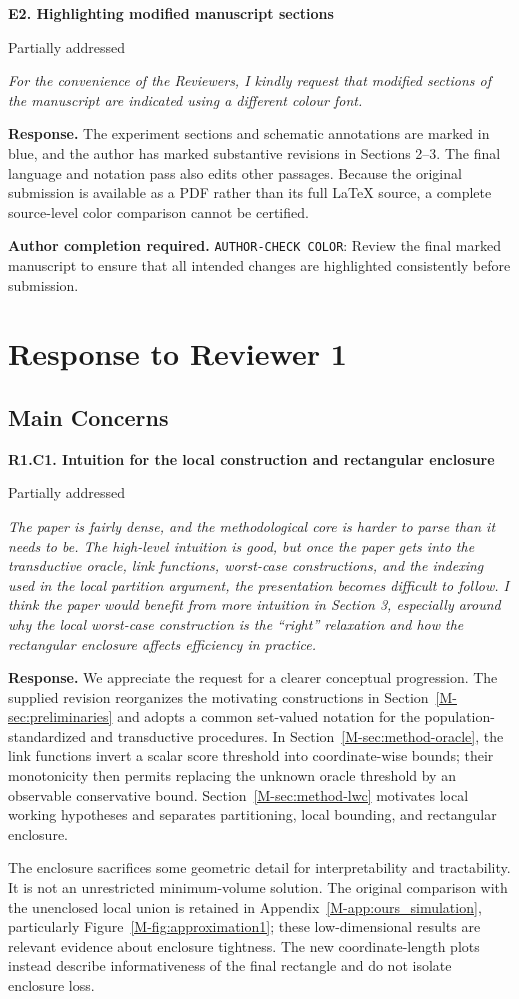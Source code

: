 \documentclass[11pt]{article}
\newcommand{\mssec}[1]{Section~\ref*{M-#1}}
\newcommand{\msapp}[1]{Appendix~\ref*{M-#1}}
\newcommand{\msfig}[1]{Figure~\ref*{M-#1}}
\newcommand{\action}[1]{\par{\small\color{ActionRed}\textbf{Author completion required.} #1\par}}
\newcommand{\point}[3]{\par\Needspace{7\baselineskip}\medskip
\noindent\parbox[t]{0.77\linewidth}{\textbf{#1}}\hfill
\parbox[t]{0.21\linewidth}{\raggedleft\small\sffamily #2}\par\nopagebreak
{\color{ReviewerBlue}\small\itshape #3\par}\textbf{Response.} }
\begin{document}
\point{E2. Highlighting modified manuscript sections}{Partially addressed}{For the convenience of the Reviewers, I kindly request that modified
sections of the manuscript are indicated using a different colour font.}
\label{response:E2}
The experiment sections and schematic annotations are marked in blue, and the author has marked substantive revisions in Sections 2--3. The final language and notation pass also edits other passages. Because the original submission is available as a PDF rather than its full LaTeX source, a complete source-level color comparison cannot be certified. \action{\texttt{AUTHOR-CHECK COLOR}: Review the final marked manuscript to ensure that all intended changes are highlighted consistently before submission.}

\clearpage
\section*{Response to Reviewer 1}
\subsection*{Main Concerns}

\point{R1.C1. Intuition for the local construction and rectangular enclosure}{Partially addressed}{The paper is fairly dense, and the methodological core is harder to parse
than it needs to be. The high-level intuition is good, but once the paper
gets into the transductive oracle, link functions, worst-case
constructions, and the indexing used in the local partition argument,
the presentation becomes difficult to follow. I think the paper would
benefit from more intuition in Section 3, especially around why the local
worst-case construction is the ``right'' relaxation and how the
rectangular enclosure affects efficiency in practice.}
\label{response:R1.C1}
We appreciate the request for a clearer conceptual progression. The supplied revision reorganizes the motivating constructions in \mssec{sec:preliminaries} and adopts a common set-valued notation for the population-standardized and transductive procedures. In \mssec{sec:method-oracle}, the link functions invert a scalar score threshold into coordinate-wise bounds; their monotonicity then permits replacing the unknown oracle threshold by an observable conservative bound. \mssec{sec:method-lwc} motivates local working hypotheses and separates partitioning, local bounding, and rectangular enclosure.

The enclosure sacrifices some geometric detail for interpretability and tractability. It is not an unrestricted minimum-volume solution. The original comparison with the unenclosed local union is retained in \msapp{app:ours_simulation}, particularly \msfig{fig:approximation1}; these low-dimensional results are relevant evidence about enclosure tightness. The new coordinate-length plots instead describe informativeness of the final rectangle and do not isolate enclosure loss.
\end{document}
